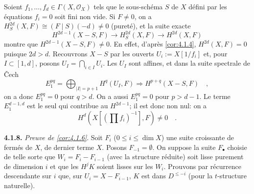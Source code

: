 \documentclass[12pt,a4paper]{article}
\theoremstyle{plain}
\theoremstyle{definition}
\newcommand{\cO}{\mathcal{O}}
\providecommand{\cO}{\mathcal{O}}
\begin{document}
Soient $f_{1},\ldots,f_{d} \in \Gamma(X,\cO_{X})$ tels que le sous-sch\'{e}ma $S$ de $X$ d\'{e}fini par les \'{e}quations $f_{i} = 0$ soit fini non vide. Si $F \neq 0$, on a $H^{2d}_{S}(X,F) \cong (F \mid S)(-d) \neq 0$ (puret\'{e}), et la suite exacte
\[
H^{2d-1}(X-S,F) \longrightarrow H^{2d}_{S}(X,F) \longrightarrow H^{2d}(X,F)
\]
montre que $H^{2d-1}(X-S,F) \neq 0$. En effet, d'apr\`{e}s \ref{cor:4.1.4}, $H^{2d}(X,F) = 0$ puisque $2d > d$. Recouvrons $X-S$ par les ouverts $U_{i} := X[1/f_{i}]$ et, pour $I \subset [1,d]$, posons $U_{I} = \bigcap_{i \in I} U_{i}$. Les $U_{I}$ sont affines, et dans la suite spectrale de \v{C}ech
\[
E_{1}^{pq} = \bigoplus_{|I|=p+1} H^{q}(U_{I},F) \Rightarrow H^{p+q}(X-S,F)\quad,
\]
on a donc $E_{1}^{pq} = 0$ pour $q > d$. On a aussi $E_{1}^{pq} = 0$ pour $p > d-1$. Le terme $E_{1}^{d-1,d}$ est le seul qui contribue au $H^{2d-1}$; il est donc non nul: on a
\[
H^{d}(X[(\prod f_{i})^{-1}], F) \neq 0\quad.
\]

\noindent\textbf{4.1.8.} \emph{Preuve de \ref{cor:4.1.6}}. Soit $F_{i}$ ($0 \leq i \leq \dim X$) une suite croissante de ferm\'{e}s de $X$, de dernier terme $X$. Posons $F_{-1} = \emptyset$. On suppose la suite $F_{\bullet}$ choisie de telle sorte que $W_{i} = F_{i} - F_{i-1}$ (avec la structure r\'{e}duite) soit lisse purement de dimension $i$ et que les $H^{j}K$ soient lisses sur les $W_{i}$. Prouvons par r\'{e}currence descendante sur $i$ que, sur $U_{i} = X - F_{i-1}$, $K$ est dans $D^{\leq -i}$ (pour la $t$-structure naturelle).
\end{document}
